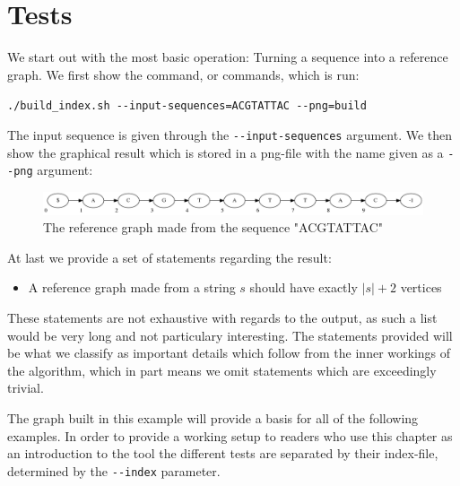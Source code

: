 \documentclass[thesis.tex]{subfiles}
\begin{document}
\section{Tests}
We start out with the most basic operation: Turning a sequence into a reference graph. We first show the command, or commands, which is run:\\
\par\noindent
\texttt{./build\_index.sh -{}-input-sequences=ACGTATTAC -{}-png=build}\\
\par\noindent
The input sequence is given through the \texttt{-{}-input-sequences} argument. We then show the graphical result which is stored in a png-file with the name given as a \texttt{-{}-png} argument:\\
\begin{figure}[!h]
  \begin{mdframed}
    \includegraphics[width=\textwidth]{output/build.png} 
  \end{mdframed}
  \caption{The reference graph made from the sequence "ACGTATTAC"}
  \label{fig:validation_ref}
\end{figure}
\par\noindent
At last we provide a set of statements regarding the result:
\begin{itemize}
\item A reference graph made from a string $s$ should have exactly $|s|+2$ vertices
\end{itemize}
These statements are not exhaustive with regards to the output, as such a list would be very long and not particulary interesting. The statements provided will be what we classify as important details which follow from the inner workings of the algorithm, which in part means we omit statements which are exceedingly trivial.\\
\par\noindent
The graph built in this example will provide a basis for all of the following examples. In order to provide a working setup to readers who use this chapter as an introduction to the tool the different tests are separated by their index-file, determined by the \texttt{-{}-index} parameter.
\end{document}
